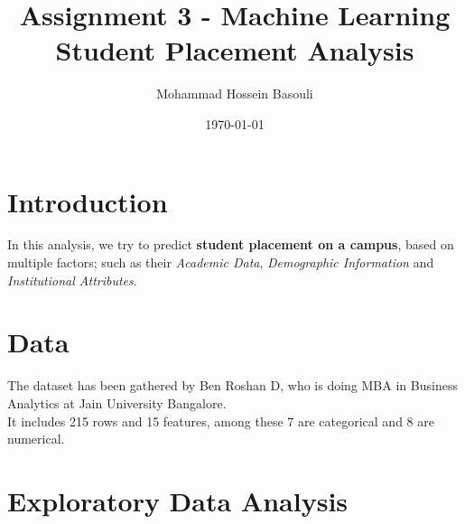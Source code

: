 \documentclass[a4paper,12pt]{article}
\begin{document}
\title{Assignment 3 - Machine Learning \\
Student Placement Analysis}
\author{Mohammad Hossein Basouli}
\date{\today}
\maketitle

\section{Introduction}
In this analysis, we try to predict \textbf{student placement on a campus}, based on multiple factors; such as their \textit{Academic Data}, \textit{Demographic Information} and
\textit{Institutional Attributes}. 

\section{Data}
The dataset\cite{dataset} has been gathered by Ben Roshan D, who is doing MBA in Business Analytics at Jain University Bangalore. \\ 
It includes 215 rows and 15 features, among these 7 are categorical and 8 are numerical. 

\section{Exploratory Data Analysis}
\end{document}
